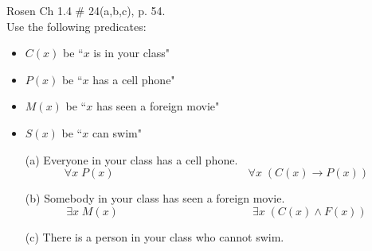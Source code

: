 \documentclass[12pt,addpoints]{exam}
\newcommand{\ra}{\rightarrow}
\begin{document}
\begin{questions}
\question[6] Rosen Ch 1.4 \# 24(a,b,c), p. 54. \\
Use the following predicates:
\begin{itemize}
    \item $C(x)$ be ``$x$ is in your class"
    \item $P(x)$ be ``$x$ has a cell phone"
    \item $M(x)$ be ``$x$ has seen a foreign movie"
    \item $S(x)$ be ``$x$ can swim"
\end{itemize}
    \begin{solution}
    \begin{itemize}
        \item[(a)] Everyone in your class has a cell phone.
        $$ \forall x\; P(x) \hspace{2in} \forall x\; (C(x) \ra P(x))$$
        \item[(b)] Somebody in your class has seen a foreign movie.
        $$ \exists x\; M(x) \hspace{2in} \exists x\; (C(x) \wedge F(x))$$
        \item[(c)] There is a person in your class who cannot swim.

\end{itemize}
\end{solution}
\end{questions}
\end{document}
